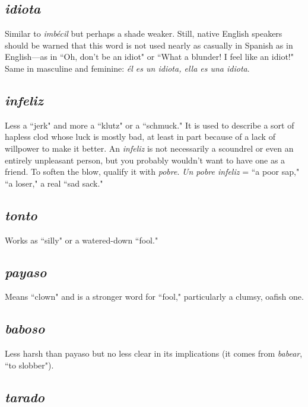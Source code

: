 \subsection{\emph{idiota}}

Similar to \emph{imbécil} but perhaps a shade weaker. Still,
native English speakers should be warned that this word is not used
nearly as casually in Spanish as in English---as in ``Oh, don't be an
idiot" or ``What a blunder! I feel like an idiot!" Same in masculine and
feminine: \emph{él es un idiota, ella es una idiota}.

\subsection{\emph{infeliz}}

Less a ``jerk" and more a ``klutz" or a ``schmuck." It
is used to describe a sort of hapless clod whose luck is mostly bad, at
least in part because of a lack of willpower to make it better. An \emph{infeliz}
is not necessarily a scoundrel or even an entirely unpleasant person,
but you probably wouldn't want to have one as a friend. To soften the
blow, qualify it with \emph{pobre}. \emph{Un pobre infeliz} = ``a poor sap," ``a loser," a real ``sad sack."

\subsection{\emph{tonto}}

Works as ``silly" or a watered-down ``fool."

\subsection{\emph{payaso}}

Means ``clown" and is a stronger word for ``fool,"
particularly a clumsy, oafish one.

\subsection{\emph{baboso}}

Less harsh than payaso but no less clear in its implications (it comes from \emph{babear}, ``to slobber").

\subsection{\emph{tarado}}

